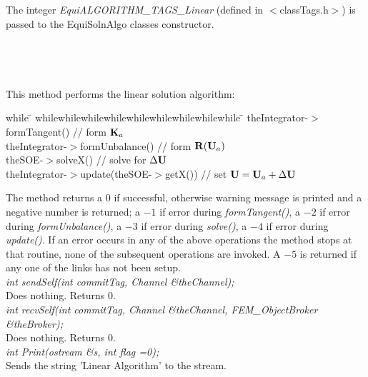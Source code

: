  \\ 
\\ 
The integer {\em EquiALGORITHM\_TAGS\_Linear} (defined in
$<$classTags.h$>$) is passed to the EquiSolnAlgo classes
constructor. \\

 \\
\\ 

  \\
 \\
This method performs the linear solution algorithm:
\begin{tabbing}
while \= \+ whilewhilewhilewhilewhilewhilewhilewhilewhile \= \kill
theIntegrator-$>$formTangent() \+ // form ${\bf K}_{a}$ \- \\
theIntegrator-$>$formUnbalance() // form ${\bf R}({\bf U}_{a})$ \\
theSOE-$>$solveX() // solve for $\Delta {\bf U}$ \\
theIntegrator-$>$update(theSOE-$>$getX()) // set ${\bf U} = {\bf U}_{a} + \Delta {\bf U}$ \-  
\end{tabbing}

The method returns a 0 if successful, otherwise warning message is
printed and a negative number is returned; a $-1$ if error during {\em
formTangent()}, a $-2$ if error during {\em formUnbalance()}, a $-3$
if error during {\em solve()}, a $-4$ if error during {\em
update()}. If an error occurs in any of the above operations the
method stops at that routine, none of the subsequent operations are
invoked. A $-5$ is returned if any one of the links has not been
setup. \\


{\em int sendSelf(int commitTag, Channel \&theChannel);}\\
Does  nothing. Returns 0. \\


{\em int recvSelf(int commitTag, Channel \&theChannel, FEM\_ObjectBroker
\&theBroker);}\\ 
Does nothing. Returns 0. \\

{\em int Print(ostream \&s, int flag =0);} \\
Sends the string 'Linear Algorithm' to the stream.